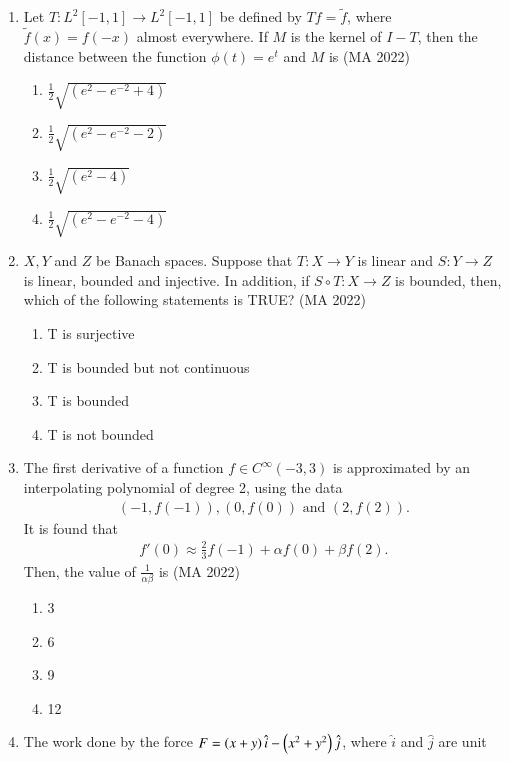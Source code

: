 \documentclass[journal,12pt,onecolumn]{IEEEtran}
\theoremstyle{remark}
\begin{document}
\begin{enumerate}
\item Let $T:L^{2}[-1,1]\rightarrow L^{2}[-1,1]$ be defined by  $Tf = \tilde{f}$, where  $\tilde{f}(x) = f(-x)$ almost everywhere.
If $M$ is the kernel of $I-T$, then the distance between the function  $\phi(t) = e^t$  and $M$ is 
\hfill{(MA 2022)}
\begin{multicols}{2}
\begin{enumerate}
\item \quad $\frac{1}{2}\sqrt{(e^{2}-e^{-2}+4)}$
\item \quad $\frac{1}{2}\sqrt{(e^{2}-e^{-2}-2)}$ 
\item \quad $\frac{1}{2}\sqrt{(e^{2}-4)} $
\item \quad $\frac{1}{2}\sqrt{(e^{2}-e^{-2}-4)}$
\end{enumerate}
\end{multicols}
\item $X, Y $ and $Z$ be Banach spaces. Suppose that $T:X\rightarrow Y$ is linear and $S:Y \rightarrow Z$ is linear, bounded and injective. In addition, if $ S \circ T : X \rightarrow Z$ is bounded, then, which of the following statements is TRUE?
\hfill{(MA 2022)}
\begin{enumerate}
\item T is surjective
\item T is bounded but not continuous
\item T is bounded 
\item T is not bounded 
\end{enumerate}
\item The first derivative of a function $f \in C^{\infty}(-3, 3)$ is approximated by an interpolating polynomial of degree 2, using the data
\begin{align}
(-1, f(-1)),(0, f(0)) \text{ and } (2, f(2)).
\end{align}
It is found that
\begin{align}
f'(0) \approx \frac{2}{3}f(-1) + \alpha f(0) + \beta f(2).
\end{align}
Then, the value of $\frac{1}{\alpha \beta}$ is
\hfill{(MA 2022)}
\begin{multicols}{4}
\begin{enumerate}
\item 3 
\item 6
\item 9
\item 12
\end{enumerate}
\end{multicols}
\item The work done by the force $F = \left(x+y\right)\hat{i} - \left(x^2+y^2\right)\hat{j}$, where $\hat{i}$ and $\hat{j}$ are unit

\end{enumerate}
\end{document}
